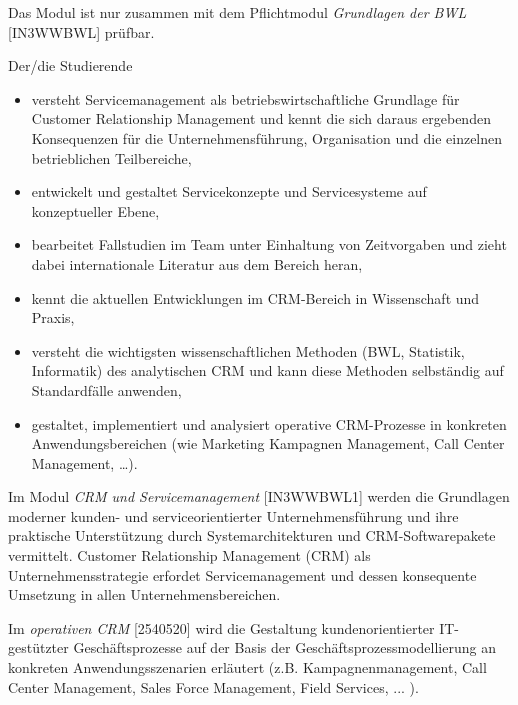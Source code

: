 \begin{module}
\begin{styleenv}
\begin{assessment}
\end{assessment}

\begin{conditions}Das Modul ist nur zusammen mit dem Pflichtmodul \emph{Grundlagen der BWL} [IN3WWBWL] prüfbar.

\end{conditions}


\end{styleenv}

\begin{learningoutcomes}
 

Der/die Studierende

 \begin{itemize}\item versteht Servicemanagement als betriebswirtschaftliche Grundlage für Customer Relationship Management und kennt die sich daraus ergebenden Konsequenzen für die Unternehmensführung, Organisation und die einzelnen betrieblichen Teilbereiche,  \item entwickelt und gestaltet Servicekonzepte und Servicesysteme auf konzeptueller Ebene,  \item bearbeitet Fallstudien im Team unter Einhaltung von Zeitvorgaben und zieht dabei internationale Literatur aus dem Bereich heran,  \item kennt die aktuellen Entwicklungen im CRM-Bereich in Wissenschaft und Praxis,  \item versteht die wichtigsten wissenschaftlichen Methoden (BWL, Statistik, Informatik) des analytischen CRM und kann diese Methoden selbständig auf Standardfälle anwenden,  \item gestaltet, implementiert und analysiert operative CRM-Prozesse in konkreten Anwendungsbereichen (wie Marketing Kampagnen Management, Call Center Management, …).  \end{itemize}
\end{learningoutcomes}

\begin{content}
Im Modul \emph{CRM und Servicemanagement} [IN3WWBWL1] werden die Grundlagen moderner kunden- und serviceorientierter Unternehmensführung und ihre praktische Unterstützung durch Systemarchitekturen und CRM-Softwarepakete vermittelt. Customer Relationship Management (CRM) als Unternehmensstrategie erfordet Servicemanagement und dessen konsequente Umsetzung in allen Unternehmensbereichen.

 

Im \emph{operativen CRM} [2540520] wird die Gestaltung kundenorientierter IT-gestützter Geschäftsprozesse auf der Basis der Geschäftsprozessmodellierung an konkreten Anwendungsszenarien erläutert (z.B. Kampagnenmanagement, Call Center Management, Sales Force Management, Field Services, ... ).


\end{content}
\end{module}
